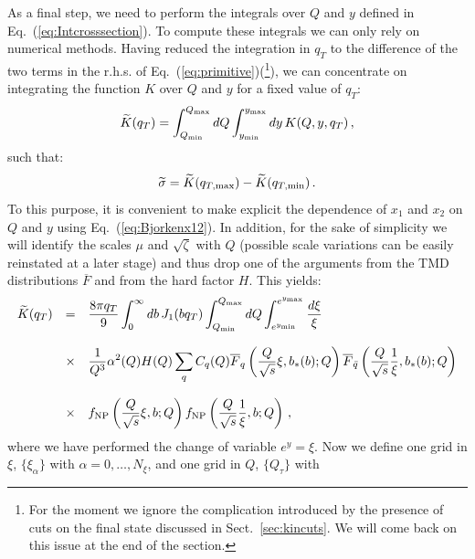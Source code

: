 \documentclass[10pt,a4paper]{article}
\begin{document}
As a final step, we need to perform the integrals over $Q$ and $y$
defined in Eq.~(\ref{eq:Intcrosssection}). To compute these integrals
we can only rely on numerical methods. Having reduced the integration
in $q_T$ to the difference of the two terms in the r.h.s. of
Eq.~(\ref{eq:primitive})(\footnote{For the moment we ignore the
  complication introduced by the presence of cuts on the final state
  discussed in Sect.~\ref{sec:kincuts}. We will come back on this
  issue at the end of the section.}), we can concentrate on
integrating the function $K$ over $Q$ and $y$ for a fixed value of
$q_T$:
\begin{equation}
\widetilde{K}(q_T)=\int_{Q_{\rm min}}^{Q_{\rm max}}dQ \int_{y_{\rm
    min}}^{y_{\rm max}}dy\,K(Q,y,q_T)\,,
\end{equation}
such that:
\begin{equation}
  \widetilde{\sigma} = \widetilde{K} (q_{T,\rm max})- \widetilde{K} (q_{T,\rm min})\,.
\end{equation}
To this purpose, it is convenient to make explicit the dependence of
$x_1$ and $x_2$ on $Q$ and $y$ using Eq.~(\ref{eq:Bjorkenx12}). In
addition, for the sake of simplicity we will identify the scales $\mu$
and $\sqrt{\zeta}$ with $Q$ (possible scale variations can be easily
reinstated at a later stage) and thus drop one of the arguments from
the TMD distributions $\overline{F}$ and from the hard factor $H$.
This yields:
\begin{equation}\label{eq:finalintegral}
\begin{array}{rcl}
\displaystyle  \widetilde{K}(q_T) &=& \displaystyle \frac{8\pi q_T}{9} \int_0^\infty db\, J_1(bq_T)
  \int_{Q_{\rm min}}^{Q_{\rm max}}
  dQ \int_{e^{y_{\rm
    min}}}^{e^{y_{\rm max}}}\frac{d\xi}{\xi}\\
\\
&\times& \displaystyle 
                         \frac{1}{Q^3} \alpha^2(Q) H(Q)\sum_q C_q(Q)\overline{F}_q\left(\frac{Q}{\sqrt{s}}\xi,b_*(b);Q\right)
                         \overline{F}_{\bar{q}}\left(\frac{Q}{\sqrt{s}}\frac1{\xi},b_*(b);Q\right) \\
\\
&\times& \displaystyle f_{\rm NP}\left(\frac{Q}{\sqrt{s}}\xi,b;Q\right)
  f_{\rm NP}\left(\frac{Q}{\sqrt{s}}\frac1{\xi},b;Q\right)\,,
\end{array}
\end{equation}
where we have performed the change of variable $e^{y} = \xi$. Now we
define one grid in $\xi$, $\{\xi_\alpha\}$ with
$\alpha=0,\dots,N_\xi$, and one grid in $Q$, $\{Q_\tau\}$ with
\end{document}
